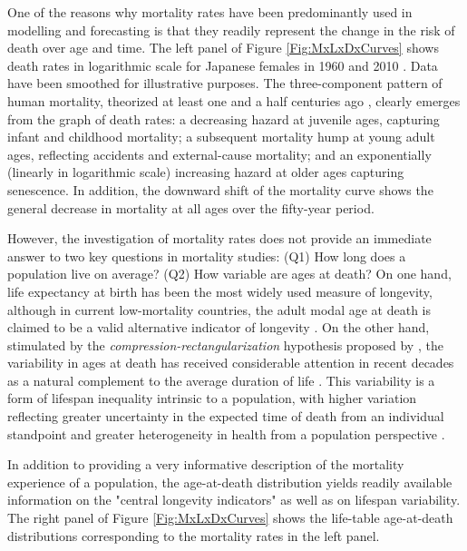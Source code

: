 \documentclass[Thesis]{subfiles}
\begin{document}
One of the reasons why mortality rates have been predominantly used in modelling and forecasting is that they readily represent the change in the risk of death over age and time. The left panel of Figure \ref{Fig:MxLxDxCurves} shows death rates in logarithmic scale for Japanese females in 1960 and 2010 \cite[data obtained from the][]{HMD}. Data have been smoothed for illustrative purposes. The three-component pattern of human mortality, theorized at least one and a half centuries ago \citep{thiele1871mathematical}, clearly emerges from the graph of death rates: a decreasing hazard at juvenile ages, capturing infant and childhood mortality; a subsequent mortality hump at young adult ages, reflecting accidents and external-cause mortality; and an exponentially (linearly in logarithmic scale) increasing hazard at older ages capturing senescence. In addition, the downward shift of the mortality curve shows the general decrease in mortality at all ages over the fifty-year period.

However, the investigation of mortality rates does not provide an immediate answer to two key questions in mortality studies: (Q1) How long does a population live on average? (Q2) How variable are ages at death? On one hand, life expectancy at birth has been the most widely used measure of longevity, although in current low-mortality countries, the adult modal age at death is claimed to be a valid alternative indicator of longevity \citep{kannisto2001mode,horiuchi2013modal}. On the other hand, stimulated by the \emph{compression-rectangularization} hypothesis proposed by \cite{fries1980aging}, the variability in ages at death has received considerable attention in recent decades as a natural complement to the average duration of life \citep{myers1984compression,rothenberg1991population,wilmoth1999rectangularization,shkolnikov2003gini,kannisto2000measuring}. This variability is a form of lifespan inequality intrinsic to a population, with higher variation reflecting greater uncertainty in the expected time of death from an individual standpoint and greater heterogeneity in health from a population perspective \citep{edwards2005inequality,edwards2013cost,sasson2016trends}.

In addition to providing a very informative description of the mortality experience of a population, the age-at-death distribution yields readily available information on the "central longevity indicators" \cite[mean, median and modal age at death,][]{cheung2005three,canudas2010three} as well as on lifespan variability. The right panel of Figure \ref{Fig:MxLxDxCurves} shows the life-table age-at-death distributions corresponding to the mortality rates in the left panel.
\end{document}
